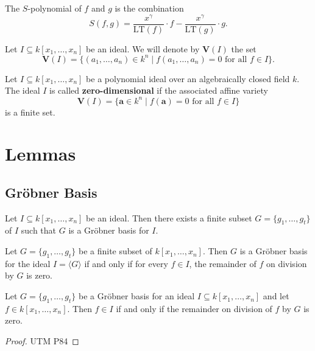 \begin{definition}\label{S Polynomial}
  \leanok
  The $S$-polynomial of $f$ and $g$ is the combination
  \[
  S(f, g) = \frac{x^\gamma}{\mathrm{LT}(f)} \cdot f - \frac{x^\gamma}{\mathrm{LT}(g)} \cdot g.
  \]
\end{definition}

\begin{definition}\label{Variety}
  Let \( I \subseteq k[x_1, \ldots, x_n] \) be an ideal. We will denote by \( \mathbf{V}(I) \) the set
  \[
  \mathbf{V}(I) = \{(a_1, \ldots, a_n) \in k^n \mid f(a_1, \ldots, a_n) = 0 \text{ for all } f \in I\}.
  \]
\end{definition}

\begin{definition}\label{Zerodimensional Ideal}
  Let \( I \subseteq k[x_1, \ldots, x_n] \) be a polynomial ideal over an algebraically closed field \( k \).
  The ideal \( I \) is called \textbf{zero-dimensional} if the associated affine variety
  \[
  \mathbf{V}(I) = \{\mathbf{a} \in k^n \mid f(\mathbf{a}) = 0 \text{ for all } f \in I\}
  \]
  is a finite set.
  \end{definition}

\chapter{Lemmas}
\section{Gröbner Basis}
\begin{lemma}\label{exists_groebner_basis}
  Let \( I \subseteq k[x_1, \ldots, x_n] \) be an ideal. Then there exists a finite subset \( G = \{g_1, \ldots, g_t\} \) of \( I \) such that \( G \) is a Gröbner basis for \( I \).
\end{lemma}

\begin{lemma}\label{is_groebner_basis_iff}
  Let \( G = \{g_1, \ldots, g_t\} \) be a finite subset of \( k[x_1, \ldots, x_n] \). Then \( G \) is a Gröbner basis for the ideal \( I = \langle G \rangle \) if and only if  for every \( f \in I \), the remainder of \( f \) on division by \( G \) is zero.
\end{lemma}


\begin{lemma}\label{groebner_basis_isRemainder_zero_iff_mem_span}
  Let \( G = \{g_1, \dots, g_t\} \) be a Gröbner basis for an ideal \( I \subseteq k[x_1, \dots, x_n] \) and let \( f \in k[x_1, \dots, x_n] \). Then \( f \in I \) if and only if the remainder on division of \( f \) by \( G \) is zero.
\end{lemma}
\begin{proof}
  UTM P84
\end{proof}

